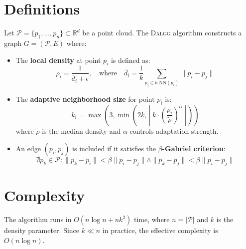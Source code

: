 \documentclass{article}
\newcommand{\dalgg}{\textsc{Dalgg}\xspace}
\newcommand{\R}{\mathbb{R}}
\begin{document}
\section*{Definitions}

Let $\mathcal{P} = \{p_1, \ldots, p_n\} \subset \R^d$ be a point cloud. The \dalgg algorithm constructs a graph $G = (\mathcal{P}, E)$ where:

\begin{itemize}
    \item The \textbf{local density} at point $p_i$ is defined as:
    \[
    \rho_i = \frac{1}{\bar{d}_i + \epsilon}, \quad \text{where} \quad \bar{d}_i = \frac{1}{k}\sum_{p_j \in k\text{-NN}(p_i)} \|p_i - p_j\|
    \]
    
    \item The \textbf{adaptive neighborhood size} for point $p_i$ is:
    \[
    k_i = \max\left(3, \min\left(2k, \left\lfloor k \cdot \left(\frac{\rho_i}{\tilde{\rho}}\right)^{\alpha} \right\rfloor\right)\right)
    \]
    where $\tilde{\rho}$ is the median density and $\alpha$ controls adaptation strength.
    
    \item An edge $(p_i, p_j)$ is included if it satisfies the \textbf{$\beta$-Gabriel criterion}:
    \[
    \nexists p_k \in \mathcal{P} : \|p_k - p_i\| < \beta \|p_i - p_j\| \wedge \|p_k - p_j\| < \beta \|p_i - p_j\|
    \]
\end{itemize}

\section*{Complexity}

The algorithm runs in $O(n \log n + nk^2)$ time, where $n = |\mathcal{P}|$ and $k$ is the density parameter. Since $k \ll n$ in practice, the effective complexity is $O(n \log n)$.
\end{document}
